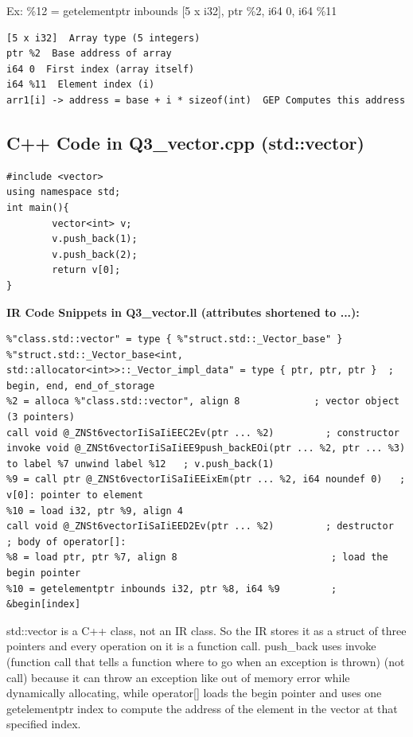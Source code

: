 \documentclass[11pt,a4paper]{article}
\begin{document}
Ex: \%12 = getelementptr inbounds [5 x i32], ptr \%2, i64 0, i64 \%11


\begin{lstlisting}
[5 x i32]  Array type (5 integers)
ptr %2  Base address of array
i64 0  First index (array itself)
i64 %11  Element index (i)
arr1[i] -> address = base + i * sizeof(int)  GEP Computes this address
\end{lstlisting}

\subsection{C++ Code in Q3\_vector.cpp (std::vector)}

\begin{lstlisting}
#include <vector>
using namespace std;
int main(){
        vector<int> v;
        v.push_back(1);
        v.push_back(2);
        return v[0];
}
\end{lstlisting}

\medskip\noindent\textbf{IR Code Snippets in Q3\_vector.ll (attributes shortened to ...):}\par\nopagebreak[4]

\begin{lstlisting}
%"class.std::vector" = type { %"struct.std::_Vector_base" }
%"struct.std::_Vector_base<int, std::allocator<int>>::_Vector_impl_data" = type { ptr, ptr, ptr }  ; begin, end, end_of_storage
%2 = alloca %"class.std::vector", align 8             ; vector object (3 pointers)
call void @_ZNSt6vectorIiSaIiEEC2Ev(ptr ... %2)         ; constructor
invoke void @_ZNSt6vectorIiSaIiEE9push_backEOi(ptr ... %2, ptr ... %3) to label %7 unwind label %12   ; v.push_back(1)
%9 = call ptr @_ZNSt6vectorIiSaIiEEixEm(ptr ... %2, i64 noundef 0)   ; v[0]: pointer to element
%10 = load i32, ptr %9, align 4
call void @_ZNSt6vectorIiSaIiEED2Ev(ptr ... %2)         ; destructor
; body of operator[]:
%8 = load ptr, ptr %7, align 8                           ; load the begin pointer
%10 = getelementptr inbounds i32, ptr %8, i64 %9         ; &begin[index]
\end{lstlisting}

std::vector is a C++ class, not an IR class. So the IR stores it as a struct of three pointers and every operation on it is a function call. push\_back uses invoke (function call that tells a function where to go when an exception is thrown) (not call) because it can throw an exception like out of memory error while dynamically allocating, while operator[] loads the begin pointer and uses one getelementptr index to compute the address of the element in the vector at that specified index.
\end{document}
